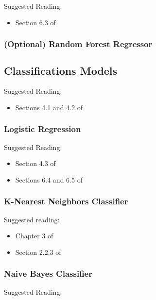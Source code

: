 \documentclass[11pt]{article}
\theoremstyle{plain}
\theoremstyle{definition}
\begin{document}
Suggested Reading:

\begin{itemize}
\item Section 6.3 of \cite{ISLR}
\end{itemize}


\subsubsection{(Optional) Random Forest Regressor}


\vspace{1cm}
\subsection{Classifications Models}

Suggested Reading:

\begin{itemize}
\item Sections 4.1 and 4.2 of \cite{ISLR}
\end{itemize}

\subsubsection{Logistic Regression}

Suggested Reading:

\begin{itemize}
\item Section 4.3 of \cite{ISLR}
\item Sections 6.4 and 6.5 of \cite{wilmott}
\end{itemize}

\subsubsection{K-Nearest Neighbors Classifier}

Suggested reading:

\begin{itemize}
\item Chapter 3 of \cite{wilmott}
\item Section 2.2.3 of \cite{ISLR}
\end{itemize}


\subsubsection{Naive Bayes Classifier}

Suggested Reading:
\end{document}
